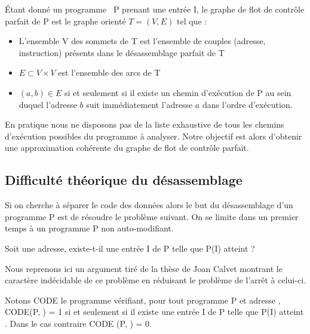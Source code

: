 \begin{defi}
 Étant donné un programme \nsm\ P prenant une entrée I, le graphe de flot de contrôle parfait de P est le graphe orienté $T=(V, E)$ tel que :
 \begin{itemize}
  \item L'ensemble V des sommets de T est l'ensemble de couples (adresse, instruction) présents dans le désassemblage parfait de T
  \item $E\subset V\times V$ est l'ensemble des arcs de T
  \item $(a, b)\in E$ si et seulement si il existe un chemin d'exécution de P au sein duquel l'adresse $b$ suit immédiatement l'adresse $a$ dans l'ordre d'exécution.
 \end{itemize}
\label{def:cfg_parfait_nsm}
\end{defi}

En pratique nous ne disposons pas de la liste exhaustive de tous les chemins d'exécution possibles du programme à analyser. Notre objectif est alors d'obtenir une approximation cohérente du graphe de flot de contrôle parfait. 



\subsection{Difficulté théorique du désassemblage}
Si on cherche à séparer le code des données alors le but du désassemblage d'un programme P est de résoudre le problème suivant. On se limite dans un premier temps à un programme P non auto-modifiant.
\begin{pb*}
Soit  une adresse, existe-t-il une entrée I de P telle que P(I) atteint  ?
\end{pb*}

Nous reprenons ici un argument tiré de la thèse de Joan Calvet \cite{Calvet2013} montrant le caractère indécidable de ce problème en réduisant le problème de l'arrêt à celui-ci.

Notons CODE le programme vérifiant, pour tout programme P et adresse , CODE(P, ) = 1 si et seulement si il existe une entrée I de P telle que P(I) atteint . Dans le cas contraire CODE (P, ) = 0.

